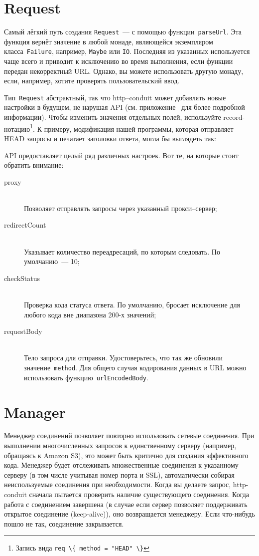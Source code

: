 \section{Request}
Самый лёгкий путь создания \lstinline!Request!~--- с помощью
функции~\lstinline!parseUrl!. Эта функция вернёт значение в любой
монаде, являющейся экземпляром класса~\lstinline!Failure!, например,
\lstinline!Maybe! или \lstinline!IO!. Последняя из указанных
используется чаще всего и приводит к исключению во время выполнения,
если функции передан некорректный URL. Однако, вы можете использовать
другую монаду, если, например, хотите проверять пользовательский ввод.

Тип~\lstinline!Request! абстрактный, так что http--conduit может
добавлять новые настройки в будущем, не нарушая API
(см. приложение~ для более подробной
информации). Чтобы изменить значения отдельных полей, используйте
record-нотацию\footnote{Запись вида \lstinline'req \{ method = "HEAD" \}'}. К примеру, модификация
нашей программы, которая отправляет HEAD запросы и печатает заголовки
ответа, могла бы выглядеть так:

API предоставляет целый ряд различных настроек. Вот те, на которые стоит
обратить внимание:
\begin{description}
\item[proxy] \hfill \\
  Позволяет отправлять запросы через указанный прокси--сервер;
\item[redirectCount] \hfill \\
  Указывает количество переадресаций, по которым следовать. По
  умолчанию~--- 10;
\item[checkStatus] \hfill \\
  Проверка кода статуса ответа. По умолчанию, бросает исключение
  для любого кода вне диапазона 200-х значений;
\item[requestBody] \hfill \\
  Тело запроса для отправки. Удостоверьтесь, что так же обновили значение~\lstinline!method!.
  Для общего случая кодирования данных в URL можно использовать
  функцию~\lstinline!urlEncodedBody!.
\end{description}

\section{Manager}
Менеджер соединений позволяет повторно использовать
сетевые соединения. При выполнении многочисленных запросов к единственному
серверу (например, обращаясь к Amazon S3), это может быть критично для
создания эффективного кода. Менеджер будет отслеживать множественные
соединения к указанному серверу (в том числе учитывая номер порта и
SSL), автоматически собирая неиспользуемые
соединения при необходимости. Когда вы делаете запрос, http-conduit
сначала пытается проверить наличие существующего соединения. Когда
работа с соединением завершена (в случае если сервер позволяет поддерживать открытое
соединение (keep-alive)), оно возвращается менеджеру. Если
что-нибудь пошло не так, соединение закрывается.

